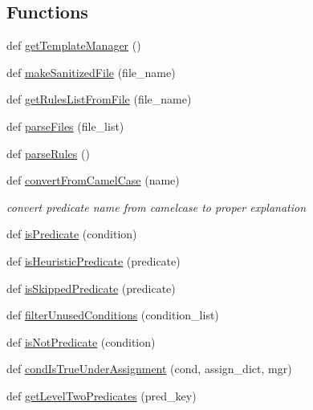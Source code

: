 \subsection*{Functions}
\begin{DoxyCompactItemize}
\item 
def \hyperlink{namespaceexplanation__extractor_a7d686ee54e958cf12fdf7f9522b8bae3}{get\+Template\+Manager} ()
\item 
def \hyperlink{namespaceexplanation__extractor_a7a90d19505230cd0706029001284f6a6}{make\+Sanitized\+File} (file\+\_\+name)
\item 
def \hyperlink{namespaceexplanation__extractor_a5d9319a84e5b2170b092d43d5eff8af4}{get\+Rules\+List\+From\+File} (file\+\_\+name)
\item 
def \hyperlink{namespaceexplanation__extractor_a003f30bfe39fe27dc9b5c95310ac37ab}{parse\+Files} (file\+\_\+list)
\item 
def \hyperlink{namespaceexplanation__extractor_acbb78e911fb2dff47a068c333495b85d}{parse\+Rules} ()
\item 
def \hyperlink{namespaceexplanation__extractor_a1208b0a7c420f414703614c42083ed8f}{convert\+From\+Camel\+Case} (name)
\begin{DoxyCompactList}\small\item\em convert predicate name from camelcase to proper explanation \end{DoxyCompactList}\item 
def \hyperlink{namespaceexplanation__extractor_a3ca2de4ae7247867c29feb24c8b85f95}{is\+Predicate} (condition)
\item 
def \hyperlink{namespaceexplanation__extractor_aecacec3e63255e9ee8653a73aa4416ce}{is\+Heuristic\+Predicate} (predicate)
\item 
def \hyperlink{namespaceexplanation__extractor_a4de4948093b3eb32c6d46109dccca83d}{is\+Skipped\+Predicate} (predicate)
\item 
def \hyperlink{namespaceexplanation__extractor_a7e792778552def0590947344cab0c799}{filter\+Unused\+Conditions} (condition\+\_\+list)
\item 
def \hyperlink{namespaceexplanation__extractor_af072d9ebdb289310aac8bdfc6d18c45d}{is\+Not\+Predicate} (condition)
\item 
def \hyperlink{namespaceexplanation__extractor_a3ff66fa3cac572ce943aadb6edd15faa}{cond\+Is\+True\+Under\+Assignment} (cond, assign\+\_\+dict, mgr)
\item 
def \hyperlink{namespaceexplanation__extractor_a25cb9de50e008dc4719c37a755767f6c}{get\+Level\+Two\+Predicates} (pred\+\_\+key)

\end{DoxyCompactItemize}
